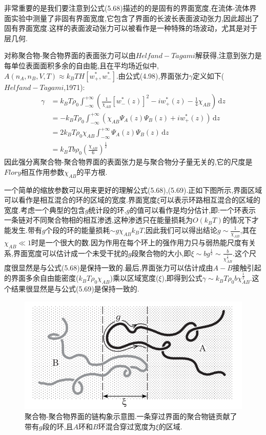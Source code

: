 非常重要的是我们要注意到公式(5.68)描述的的是固有的界面宽度,在流体-流体界面实验中测量了非固有界面宽度,它包含了界面的长波长表面波动张力,因此超出了固有界面宽度.这样的表面波动张力可以被看作是一种特殊的场波动，尤其是对于层几何.

对称聚合物-聚合物界面的表面张力可以由$Helfand−Tagami$解获得,注意到张力是每单位表面面积多余的自由能,且在平均场近似中,$A(n_A,n_B,V,T)\approx k_BTH[w_+^*,w_-^*]$.由公式(4.98),界面张力$\gamma$定义如下($Helfand−Tagami$,1971):
\begin{equation}
\begin{aligned}
\gamma&=k_B T \rho_0\int_{-\infty}^{+\infty}(\frac{1}{\chi_{AB}}[w_-^*(z)]^2-iw_+^*(z)-\frac{1}{4}\chi_{AB})\,\mathrm{d}z\\
&=-k_B T \rho_0\int_{-\infty}^{+\infty}(\chi_{AB}\Psi_{A}(z)\Psi_{B}(z)+iw_+^*(z))\,\mathrm{d}z\\
&=2k_B T \rho_0\chi_{AB}\int_{-\infty}^{+\infty}\Psi_{A}(z)\Psi_{B}(z)\,\mathrm{d}z\\
&=k_B T b \rho_0(\frac{\chi_{AB}}{6})^{\frac{1}{2}}
\end{aligned}
\end{equation}
因此强分离聚合物-聚合物界面的表面张力是与聚合物分子量无关的,它的尺度是$Flory$相互作用参数$\chi_{AB}$的平方根.

一个简单的缩放参数可以用来更好的理解公式(5.68),(5.69).正如下图所示,界面区域可以看作是相互混合的环的区域的宽度.界面宽度$\xi$可以表示环路相互混合的区域的宽度.考虑一个典型的包含$g$统计段的环,$g$的值可以看作是均分估计,即:一个环表示一条链对不同聚合物相的相互渗透,这种渗透只在能量损耗为$O(k_B T)$的情况下才能发生.带有$g$个段的环的能量损耗$\sim g\chi_{AB}k_BT$,因此我们可以得出结论$g\sim \frac{1}{\chi_{AB}}$,其在$\chi_{AB} \ll1$时是一个很大的数.因为作用在每个环上的强作用力只与弱热能尺度有关系,界面宽度可以估计成一个未受干扰的$g$段聚合物的大小,即$\xi \sim bg^{\frac{1}{2}}\sim \frac{b}{\chi_{AB}^{\frac{1}{2}}}$.这个尺度很显然是与公式(5.68)是保持一致的.最后,界面张力可以估计成由$A−B$接触引起的界面多余自由能密度($k_B T\rho_0\chi_{AB}$)乘以区域宽度($\xi$),即得到公式$\gamma\sim k_B T\rho_0b\chi_{AB}^{\frac{1}{2}}$.这个结果很显然是与公式(5.69)是保持一致的.
\begin{figure}[H]
	\centering
	\includegraphics[width=12cm]{./figures/fig5-5.png}
	\caption{聚合物-聚合物界面的链构象示意图.一条穿过界面的聚合物链贡献了带有$g$段的环,且$A$环和$B$环混合穿过宽度为$\xi$的区域.}
\end{figure}

